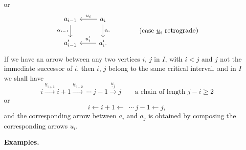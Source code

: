 or
\[
\begin{tikzcd}
a_{i-1} \arrow[d, "\alpha_{i-1}"'] & a_i \arrow[l, "u_i"'] \arrow[d, "\alpha_i"] \\
a'_{i-1} & a'_i. \arrow[l, "u'_i"']
\end{tikzcd}
\qquad\qquad \text{(case $\underline{u}_i$ retrograde)}
\]
If we have an arrow between any two vertices $i$, $j$ in $I$, with $i < j$ and $j$ not the immediate successor of $i$, then $i$, $j$ belong to the same critical interval, and in $I$ we shall have %
\[
i \xrightarrow{\underline{u}_{i+1}} i+1 \xrightarrow{\underline{u}_{i+2}}\ \cdots\ j-1 \xrightarrow{\underline{u}_j} j \qquad \text{a chain of length } j-i \geq 2 %
\]
or
\[
i \longleftarrow i+1 \longleftarrow\ \ \cdots\ j-1 \longleftarrow j,
\]
and the corresponding arrow between $a_i$ and $a_j$ is obtained by composing the corresponding arrows $u_i$.


\textbf{Examples.}

